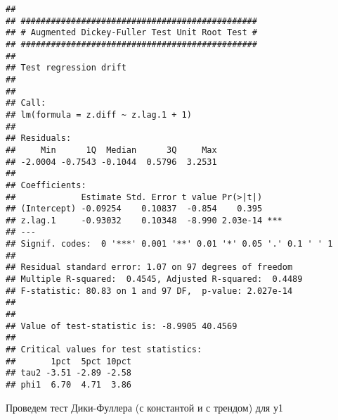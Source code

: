 \documentclass[
]{article}
\newenvironment{Shaded}{\begin{snugshade}}{\end{snugshade}}
\newcommand{\AttributeTok}[1]{\textcolor[rgb]{0.13,0.29,0.53}{#1}}
\newcommand{\DecValTok}[1]{\textcolor[rgb]{0.00,0.00,0.81}{#1}}
\newcommand{\FunctionTok}[1]{\textcolor[rgb]{0.13,0.29,0.53}{\textbf{#1}}}
\newcommand{\NormalTok}[1]{#1}
\newcommand{\SpecialCharTok}[1]{\textcolor[rgb]{0.81,0.36,0.00}{\textbf{#1}}}
\newcommand{\StringTok}[1]{\textcolor[rgb]{0.31,0.60,0.02}{#1}}
\begin{document}
\begin{Shaded}
\end{Shaded}

\begin{verbatim}
## 
## ############################################### 
## # Augmented Dickey-Fuller Test Unit Root Test # 
## ############################################### 
## 
## Test regression drift 
## 
## 
## Call:
## lm(formula = z.diff ~ z.lag.1 + 1)
## 
## Residuals:
##     Min      1Q  Median      3Q     Max 
## -2.0004 -0.7543 -0.1044  0.5796  3.2531 
## 
## Coefficients:
##             Estimate Std. Error t value Pr(>|t|)    
## (Intercept) -0.09254    0.10837  -0.854    0.395    
## z.lag.1     -0.93032    0.10348  -8.990 2.03e-14 ***
## ---
## Signif. codes:  0 '***' 0.001 '**' 0.01 '*' 0.05 '.' 0.1 ' ' 1
## 
## Residual standard error: 1.07 on 97 degrees of freedom
## Multiple R-squared:  0.4545, Adjusted R-squared:  0.4489 
## F-statistic: 80.83 on 1 and 97 DF,  p-value: 2.027e-14
## 
## 
## Value of test-statistic is: -8.9905 40.4569 
## 
## Critical values for test statistics: 
##       1pct  5pct 10pct
## tau2 -3.51 -2.89 -2.58
## phi1  6.70  4.71  3.86
\end{verbatim}

Проведем тест Дики-Фуллера (с константой и с трендом) для у1

\begin{Shaded}
\end{Shaded}
\end{document}
